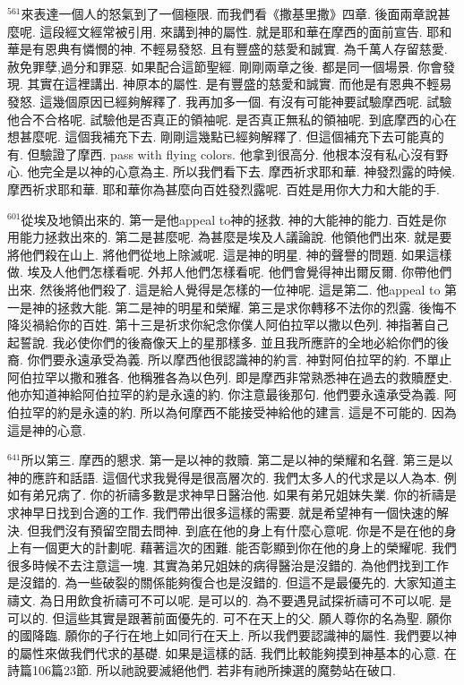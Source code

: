 \documentclass{book}
\begin{document}
$^{561}$來表達一個人的怒氣到了一個極限.
而我們看《撒基里撒》四章.
後面兩章說甚麼呢.
這段經文經常被引用.
來講到神的屬性.
就是耶和華在摩西的面前宣告.
耶和華是有恩典有憐憫的神.
不輕易發怒.
且有豐盛的慈愛和誠實.
為千萬人存留慈愛.
赦免罪孽,過分和罪惡.
如果配合這節聖經.
剛剛兩章之後.
都是同一個場景.
你會發現.
其實在這裡講出.
神原本的屬性.
是有豐盛的慈愛和誠實.
而他是有恩典不輕易發怒.
這幾個原因已經夠解釋了.
我再加多一個.
有沒有可能神要試驗摩西呢.
試驗他合不合格呢.
試驗他是否真正的領袖呢.
是否真正無私的領袖呢.
到底摩西的心在想甚麼呢.
這個我補充下去.
剛剛這幾點已經夠解釋了.
但這個補充下去可能真的有.
但驗證了摩西.
pass with flying colors.
他拿到很高分.
他根本沒有私心沒有野心.
他完全是以神的心意為主.
所以我們看下去.
摩西祈求耶和華.
神發烈露的時候.
摩西祈求耶和華.
耶和華你為甚麼向百姓發烈露呢.
百姓是用你大力和大能的手.

$^{601}$從埃及地領出來的.
第一是他appeal to神的拯救.
神的大能神的能力.
百姓是你用能力拯救出來的.
第二是甚麼呢.
為甚麼是埃及人議論說.
他領他們出來.
就是要將他們殺在山上.
將他們從地上除滅呢.
這是神的明星.
神的聲譽的問題.
如果這樣做.
埃及人他們怎樣看呢.
外邦人他們怎樣看呢.
他們會覺得神出爾反爾.
你帶他們出來.
然後將他們殺了.
這是給人覺得是怎樣的一位神呢.
這是第二.
他appeal to 第一是神的拯救大能.
第二是神的明星和榮耀.
第三是求你轉移不法你的烈露.
後悔不降災禍給你的百姓.
第十三是祈求你紀念你僕人阿伯拉罕以撒以色列.
神指著自己起誓說.
我必使你們的後裔像天上的星那樣多.
並且我所應許的全地必給你們的後裔.
你們要永遠承受為義.
所以摩西他很認識神的約言.
神對阿伯拉罕的約.
不單止阿伯拉罕以撒和雅各.
他稱雅各為以色列.
即是摩西非常熟悉神在過去的救贖歷史.
他亦知道神給阿伯拉罕的約是永遠的約.
你注意最後那句.
他們要永遠承受為義.
阿伯拉罕的約是永遠的約.
所以為何摩西不能接受神給他的建言.
這是不可能的.
因為這是神的心意.

$^{641}$所以第三.
摩西的懇求.
第一是以神的救贖.
第二是以神的榮耀和名聲.
第三是以神的應許和話語.
這個代求我覺得是很高層次的.
我們太多人的代求是以人為本.
例如有弟兄病了.
你的祈禱多數是求神早日醫治他.
如果有弟兄姐妹失業.
你的祈禱是求神早日找到合適的工作.
我們帶出很多這樣的需要.
就是希望神有一個快速的解決.
但我們沒有預留空間去問神.
到底在他的身上有什麼心意呢.
你是不是在他的身上有一個更大的計劃呢.
藉著這次的困難.
能否彰顯到你在他的身上的榮耀呢.
我們很多時候不去注意這一塊.
其實為弟兄姐妹的病得醫治是沒錯的.
為他們找到工作是沒錯的.
為一些破裂的關係能夠復合也是沒錯的.
但這不是最優先的.
大家知道主禱文.
為日用飲食祈禱可不可以呢.
是可以的.
為不要遇見試探祈禱可不可以呢.
是可以的.
但這些其實是跟著前面優先的.
可不在天上的父.
願人尊你的名為聖.
願你的國降臨.
願你的子行在地上如同行在天上.
所以我們要認識神的屬性.
我們要以神的屬性來做我們代求的基礎.
如果是這樣的話.
我們比較能夠摸到神基本的心意.
在詩篇106篇23節.
所以祂說要滅絕他們.
若非有祂所揀選的魔勢站在破口.
\end{document}
